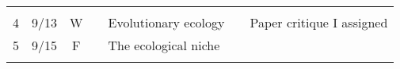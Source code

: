 \documentclass[]{article}
\begin{document}
\begin{longtable}[]{@{}cccllll@{}}
\begin{minipage}[t]{0.11\columnwidth}
\strut
\end{minipage} & \begin{minipage}[t]{0.16\columnwidth}\raggedright\strut
\strut
\end{minipage}\tabularnewline
\begin{minipage}[t]{0.12\columnwidth}\centering\strut
4\strut
\end{minipage} & \begin{minipage}[t]{0.08\columnwidth}\centering\strut
9/13\strut
\end{minipage} & \begin{minipage}[t]{0.07\columnwidth}\centering\strut
W\strut
\end{minipage} & \begin{minipage}[t]{0.10\columnwidth}\raggedright\strut
\strut
\end{minipage} & \begin{minipage}[t]{0.11\columnwidth}\raggedright\strut
Evolutionary ecology\strut
\end{minipage} & \begin{minipage}[t]{0.11\columnwidth}\raggedright\strut
\strut
\end{minipage} & \begin{minipage}[t]{0.16\columnwidth}\raggedright\strut
Paper critique I assigned\strut
\end{minipage}\tabularnewline
\begin{minipage}[t]{0.12\columnwidth}\centering\strut
5\strut
\end{minipage} & \begin{minipage}[t]{0.08\columnwidth}\centering\strut
9/15\strut
\end{minipage} & \begin{minipage}[t]{0.07\columnwidth}\centering\strut
F\strut
\end{minipage} & \begin{minipage}[t]{0.10\columnwidth}\raggedright\strut
\strut
\end{minipage} & \begin{minipage}[t]{0.11\columnwidth}\raggedright\strut
The ecological niche\strut
\end{minipage} & \begin{minipage}[t]{0.11\columnwidth}\raggedright\strut
\strut
\end{minipage} & \begin{minipage}[t]{0.16\columnwidth}\raggedright\strut
\strut
\end{minipage}\tabularnewline
\begin{minipage}[t]{0.12\columnwidth}\centering\strut

\end{minipage}
\end{longtable}
\end{document}
